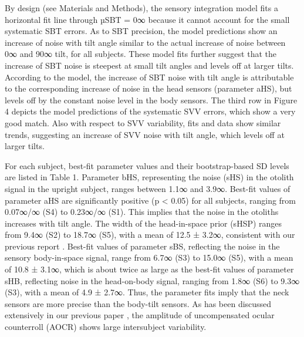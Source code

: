 By design (see Materials and Methods), the sensory integration model fits a horizontal fit line through µSBT = 0∞ because it cannot account for the small systematic SBT errors. As to SBT precision, the model predictions show an increase of noise with tilt angle similar to the actual increase of noise between 0∞ and 90∞ tilt, for all subjects. These model fits further suggest that the increase of SBT noise is steepest at small tilt angles and levels off at larger tilts. According to the model, the increase of SBT noise with tilt angle is attributable to the corresponding increase of noise in the head sensors (parameter aHS), but levels off by the constant noise level in the body sensors. The third row in Figure 4 depicts the model predictions of the systematic SVV errors, which show a very good match. Also with respect to SVV variability, fits and data show similar trends, suggesting an increase of SVV noise with tilt angle, which levels off at larger tilts. 

For each subject, best-fit parameter values and their bootstrap-based SD levels are listed in Table 1. Parameter bHS, representing the noise (sHS) in the otolith signal in the upright subject, ranges between 1.1∞ and 3.9∞. Best-fit values of parameter aHS are significantly positive (p < 0.05) for all subjects, ranging from 0.07∞/∞ (S4) to 0.23∞/∞ (S1). This implies that the noise in the otoliths increases with tilt angle. The width of the head-in-space prior (sHSP) ranges from 9.4∞ (S2) to 18.7∞ (S5), with a mean of 12.5 ± 3.2∞, consistent with our previous report \cite{devrijer2009}. Best-fit values of parameter sBS, reflecting the noise in the sensory body-in-space signal, range from 6.7∞ (S3) to 15.0∞ (S5), with a mean of 10.8 ± 3.1∞, which is about twice as large as the best-fit values of parameter sHB, reflecting noise in the head-on-body signal, ranging from 1.8∞ (S6) to 9.3∞ (S3), with a mean of 4.9 ± 2.7∞. Thus, the parameter fits imply that the neck sensors are more precise than the body-tilt sensors. As has been discussed extensively in our previous paper \cite{devrijer2009}, the amplitude of uncompensated ocular counterroll (AOCR) shows large intersubject variability. 

